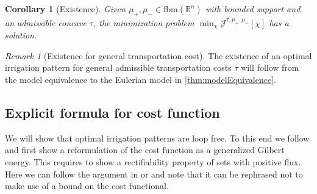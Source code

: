 \documentclass[10pt,a4paper,oneside,final]{article}
\newcommand{\R}{{\mathbb{R}}}
\newcommand{\fbm}{{\mathrm{fbm}}}
\newcommand{\JEn}{{\mathcal{J}}}
\numberwithin{equation}{section}
\theoremstyle{plain}
\newtheorem{corollary}[theorem]{Corollary}
\theoremstyle{definition}
\theoremstyle{remark}
\newtheorem{remark}[theorem]{Remark}
\begin{document}
\begin{corollary}[Existence]
Given $\mu_+,\mu_-\in\fbm(\R^n)$ with bounded support and an admissible concave $\tau$, the minimization problem
$\min_\chi \JEn^{\tau,\mu_+,\mu_-}[\chi]$
has a solution.
\end{corollary}

\begin{remark}[Existence for general transportation cost]
The existence of an optimal irrigation pattern for general admissible transportation costs $\tau$ will follow from the model equivalence to the Eulerian model in \cref{thm:modelEquivalence}.
\end{remark}


\subsection{Explicit formula for cost function}\label{sec:patternsGilbert}
We will show that optimal irrigation patterns are loop free.
To this end we follow \cite[Ch.\,4]{Bernot-Caselles-Morel-Traffic-Plans} and first show a reformulation of the cost function as a generalized Gilbert energy.
This requires to show a rectifiability property of sets with positive flux.
Here we can follow the argument in \cite[Lem.\,4.6.4]{Be05} or \cite[Lem.\,6.3]{Bernot-Caselles-Morel-Traffic-Plans} and note that it can be rephrased not to make use of a bound on the cost functional.
\end{document}
